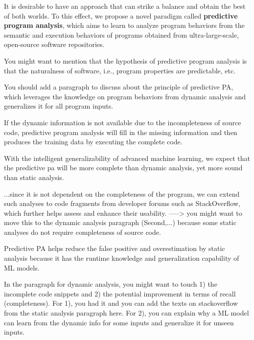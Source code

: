 
It is desirable to have an approach that can strike a balance and
obtain the best of both worlds. To this effect, we propose a novel
paradigm called {\bf predictive program analysis}, which aims to learn
to analyze program behaviors from the semantic and execution behaviors
of programs obtained from ultra-large-scale, open-source software
repositories.


You might want to mention that the hypothesis of predictive program analysis is that the naturalness of software, i.e., program properties are predictable, etc.

You should add a paragraph to discuss about the principle of predictive PA, which leverages the knowledge on program behaviors from dynamic analysis and generalizes it for all program inputs.

If the dynamic information is not available due to the incompleteness of source code, predictive program analysis will fill in the missing information and then produces the training data by executing the complete code.

With the intelligent generalizability of advanced machine learning, we expect that the predictive pa will be more complete than dynamic analysis, yet more sound than static analysis.


...since it is not dependent on the completeness of the program, we can extend such analyses to code
fragments from developer forums such as StackOverflow, which
further helps assess and enhance their usability. -----> you might want to move this to the dynamic analysis paragraph (Second,...) because some static analyses do not require completeness of source code.

Predictive PA helps reduce the false positive and overestimation by static analysis because it has the runtime knowledge and generalization capability of ML models.

In the paragraph for dynamic analysis, you might want to touch 1) the incomplete code snippets and 2) the potential improvement in terms of recall (completeness). For 1), you had it and you can add the texts on stackoverflow from the static analysis paragraph here. For 2), you can explain why a ML model can learn from the dynamic info for some inputs and generalize it for unseen inputs.

